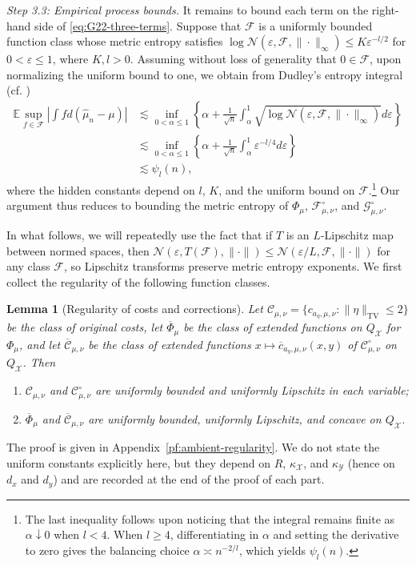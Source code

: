\documentclass[11pt]{amsart}
\newtheorem{lemma}[theorem]{Lemma}
\theoremstyle{definition}
\theoremstyle{remark}
\newcommand{\E}{\mathbb{E}}
\newcommand{\1}{\mathbf{1}}
\numberwithin{equation}{section}
\newcommand{\TV}{\mathrm{TV}}
\begin{document}
\emph{Step 3.3: Empirical process bounds.}
It remains to bound each term on the right-hand side of
\eqref{eq:G22-three-terms}. Suppose that $\mathcal F$ is a uniformly
bounded function class whose metric entropy satisfies
$\log \mathcal N(\varepsilon,\mathcal F,\|\cdot\|_\infty)
\leq K\varepsilon^{-l/2}$ for $0<\varepsilon\leq 1$, where $K,l>0$.
Assuming without loss of generality that $0\in\mathcal F$, upon normalizing
the uniform bound to one, we obtain from Dudley's entropy integral
(cf. \cite[Theorem~16]{vonLuxburgBousquet2004})
\begin{align*}
\E\sup_{f\in\mathcal{F}}
\left|\int fd(\widehat{\mu}_n-\mu)\right|
&\lesssim
\inf_{0<\alpha\leq 1}
\left\{
\alpha
+
\frac{1}{\sqrt n}
\int_\alpha^1
\sqrt{\log \mathcal N(\varepsilon,\mathcal{F},\|\cdot\|_\infty)}
d\varepsilon
\right\} \\
&\lesssim
\inf_{0<\alpha\leq 1}
\left\{
\alpha
+
\frac{1}{\sqrt n}
\int_\alpha^1
\varepsilon^{-l/4}
d\varepsilon
\right\} \\
&\lesssim
\psi_l(n),
\end{align*}
where the hidden constants depend on $l$, $K$, and the uniform bound on
$\mathcal F$.\footnote{The last inequality follows upon noticing that the
integral remains finite as $\alpha\downarrow0$ when $l<4$. When $l\geq4$,
differentiating in $\alpha$ and setting the derivative to zero gives the
balancing choice $\alpha\asymp n^{-2/l}$, which yields $\psi_l(n)$.}
Our argument thus reduces to
bounding the metric entropy of $\Phi_\mu$,
$\mathcal F^\circ_{\mu,\nu}$, and
$\mathcal G^\circ_{\mu,\nu}$.

In what follows, we will repeatedly use the fact that if $T$ is an
$L$-Lipschitz map between normed spaces, then
$\mathcal N(\varepsilon,T(\mathcal F),\|\cdot\|)\le
\mathcal N(\varepsilon/L,\mathcal F,\|\cdot\|)$ for any class
$\mathcal F$, so Lipschitz transforms preserve metric entropy exponents. We first collect the regularity of the following
function classes.

\begin{lemma}[Regularity of costs and corrections]
\label{prop:ambient-regularity}
Let $\mathcal C_{\mu,\nu}=\{c_{a_\eta,\mu,\nu}:\|\eta\|_{\TV}\le 2\}$
be the class of original costs, let $\overline\Phi_\mu$ be the class of
extended functions on $Q_{\mathcal X}$ for $\Phi_\mu$, and let
$\overline{\mathcal C}_{\mu,\nu}$ be the class of extended functions
$x\mapsto \overline{c}_{a_\eta,\mu,\nu}(x,y)$ of
$\mathcal C^\circ_{\mu,\nu}$ on $Q_{\mathcal X}$. Then
\begin{enumerate}
\item $\mathcal C_{\mu,\nu}$ and $\mathcal C^\circ_{\mu,\nu}$ are
uniformly bounded and uniformly Lipschitz in each variable;
\item $\overline\Phi_\mu$ and $\overline{\mathcal C}_{\mu,\nu}$ are
uniformly bounded, uniformly Lipschitz, and concave on $Q_{\mathcal X}$.
\end{enumerate}
\end{lemma}
The proof is given in Appendix~\ref{pf:ambient-regularity}. We do not
state the uniform constants explicitly here, but they depend on $R$,
$\kappa_\mathcal{X}$, and $\kappa_\mathcal{Y}$ (hence on $d_x$ and $d_y$) and are recorded at
the end of the proof of each part.
\end{document}
